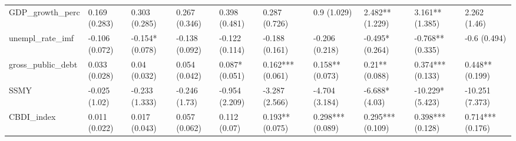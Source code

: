 \begin{table}[ht]
\begin{tabular}{llllllllll}
  GDP\_growth\_perc & 0.169 (0.283) & 0.303 (0.285) & 0.267 (0.346) & 0.398 (0.481) & 0.287 (0.726) & 0.9 (1.029) & 2.482** (1.229) & 3.161** (1.385) & 2.262 (1.46) \\ 
  unempl\_rate\_imf & -0.106 (0.072) & -0.154* (0.078) & -0.138 (0.092) & -0.122 (0.114) & -0.188 (0.161) & -0.206 (0.218) & -0.495* (0.264) & -0.768** (0.335) & -0.6 (0.494) \\ 
  gross\_public\_debt & 0.033 (0.028) & 0.04 (0.032) & 0.054 (0.042) & 0.087* (0.051) & 0.162*** (0.061) & 0.158** (0.073) & 0.21** (0.088) & 0.374*** (0.133) & 0.448** (0.199) \\ 
  SSMY & -0.025 (1.02) & -0.233 (1.333) & -0.246 (1.73) & -0.954 (2.209) & -3.287 (2.566) & -4.704 (3.184) & -6.688* (4.03) & -10.229* (5.423) & -10.251 (7.373) \\ 
  CBDI\_index & 0.011 (0.022) & 0.017 (0.043) & 0.057 (0.062) & 0.112 (0.07) & 0.193** (0.075) & 0.298*** (0.089) & 0.295*** (0.109) & 0.398*** (0.128) & 0.714*** (0.176) \\ 
   \bottomrule
\end{tabular}
\endgroup
\end{table}
